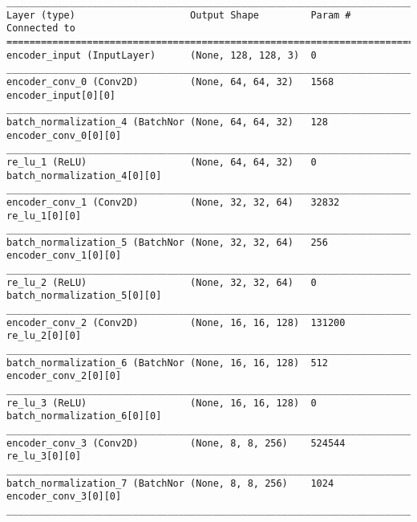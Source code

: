 \begin{lstlisting}[caption={CelebA-VAE-GAN Encoder},captionpos=b,basicstyle=\tiny, label={lst:mnist-vae-encoder}]
__________________________________________________________________________________________________
Layer (type)                    Output Shape         Param #     Connected to
==================================================================================================
encoder_input (InputLayer)      (None, 128, 128, 3)  0
__________________________________________________________________________________________________
encoder_conv_0 (Conv2D)         (None, 64, 64, 32)   1568        encoder_input[0][0]
__________________________________________________________________________________________________
batch_normalization_4 (BatchNor (None, 64, 64, 32)   128         encoder_conv_0[0][0]
__________________________________________________________________________________________________
re_lu_1 (ReLU)                  (None, 64, 64, 32)   0           batch_normalization_4[0][0]
__________________________________________________________________________________________________
encoder_conv_1 (Conv2D)         (None, 32, 32, 64)   32832       re_lu_1[0][0]
__________________________________________________________________________________________________
batch_normalization_5 (BatchNor (None, 32, 32, 64)   256         encoder_conv_1[0][0]
__________________________________________________________________________________________________
re_lu_2 (ReLU)                  (None, 32, 32, 64)   0           batch_normalization_5[0][0]
__________________________________________________________________________________________________
encoder_conv_2 (Conv2D)         (None, 16, 16, 128)  131200      re_lu_2[0][0]
__________________________________________________________________________________________________
batch_normalization_6 (BatchNor (None, 16, 16, 128)  512         encoder_conv_2[0][0]
__________________________________________________________________________________________________
re_lu_3 (ReLU)                  (None, 16, 16, 128)  0           batch_normalization_6[0][0]
__________________________________________________________________________________________________
encoder_conv_3 (Conv2D)         (None, 8, 8, 256)    524544      re_lu_3[0][0]
__________________________________________________________________________________________________
batch_normalization_7 (BatchNor (None, 8, 8, 256)    1024        encoder_conv_3[0][0]
__________________________________________________________________________________________________

\end{lstlisting}
